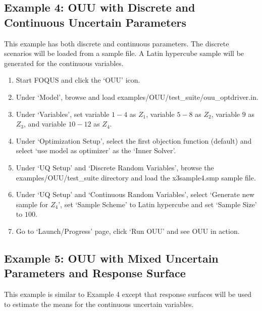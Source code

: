 \subsection{Example 4: OUU with Discrete and Continuous Uncertain Parameters}

This example has both discrete and continuous parameters. The discrete scenarios
will be loaded from a sample file. A Latin hypercube sample will be generated for
the continuous variables.
 
\begin{enumerate}
\item Start FOQUS and click the `OUU' icon.
\item Under `Model', browse and load {\sf examples/OUU/test\_suite/ouu\_optdriver.in}.
\item Under `Variables', set variable $1-4$ as $Z_1$, variable $5-8$ as $Z_2$, 
      variable $9$ as $Z_3$, and variable $10-12$ as $Z_4$.
\item Under `Optimization Setup', select the first objection function (default)
      and select `use model as optimizer' as the `Inner Solver'.
\item Under `UQ Setup' and `Discrete Random Variables', browse the
      {\sf examples/OUU/test\_suite} directory and load the
      {\sf x3sample4.smp} sample file.
\item Under `UQ Setup' and `Continuous Random Variables', select
      `Generate new sample for $Z_4$', set `Sample Scheme' to Latin hypercube
      and set `Sample Size' to $100$.
\item Go to `Launch/Progress' page, click `Run OUU' and see OUU in action.
\end{enumerate}

\subsection{Example 5: OUU with Mixed Uncertain Parameters and Response Surface}

This example is similar to Example 4 except that response surfaces will be used
to estimate the means for the continuous uncertain variables.

